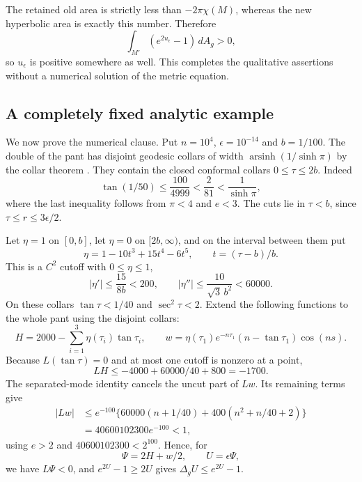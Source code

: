 \documentclass[11pt,a4paper]{article}
\theoremstyle{definition}
\begin{document}
The retained old area is strictly less than $-2\pi\chi(M)$, whereas the new hyperbolic area is exactly this number. Therefore
\[
          \int_{M'}(e^{2u_\epsilon}-1)\,dA_g>0,
\]
so $u_\epsilon$ is positive somewhere as well. This completes the qualitative assertions without a numerical solution of the metric equation.

\subsection{A completely fixed analytic example}
We now prove the numerical clause. Put $n=10^4$, $\epsilon=10^{-14}$ and $b=1/100$. The double of the pant has disjoint geodesic collars of width $\operatorname{arsinh}(1/\sinh\pi)$ by the collar theorem \cite[Theorem~2.18 and proof, pp.~22--24]{McMullen}. They contain the closed conformal collars $0\le\tau\le2b$. Indeed
\[
 \tan(1/50)\le\frac{100}{4999}<\frac2{81}<\frac1{\sinh\pi},
\]
where the last inequality follows from $\pi<4$ and $e<3$. The cuts lie in $\tau<b$, since $\tau\le r\le3\epsilon/2$.

Let $\eta=1$ on $[0,b]$, let $\eta=0$ on $[2b,\infty)$, and on the interval between them put
\[
 \eta=1-10t^3+15t^4-6t^5,\qquad t=(\tau-b)/b.
\]
This is a $C^2$ cutoff with $0\le\eta\le1$,
\[
 |\eta'|\le\frac{15}{8b}<200,\qquad
 |\eta''|\le\frac{10}{\sqrt3\,b^2}<60000.
\]
On these collars $\tan\tau<1/40$ and $\sec^2\tau<2$. Extend the following functions to the whole pant using the disjoint collars:
\[
 H=2000-\sum_{i=1}^3\eta(\tau_i)\tan\tau_i,
 \qquad w=\eta(\tau_1)e^{-n\tau_1}(n-\tan\tau_1)\cos(ns).
\]
Because $L(\tan\tau)=0$ and at most one cutoff is nonzero at a point,
\[
 LH\le-4000+60000/40+800=-1700.
\]
The separated-mode identity cancels the uncut part of $Lw$. Its remaining terms give
\begin{align*}
 |Lw|&\le e^{-100}\{60000(n+1/40)+400(n^2+n/40+2)\}\\
 &=40600102300e^{-100}<1,
\end{align*}
using $e>2$ and $40600102300<2^{100}$. Hence, for
\[
                     \Psi=2H+w/2,\qquad U=\epsilon\Psi,
\]
we have $L\Psi<0$, and $e^{2U}-1\ge2U$ gives $\Delta_gU\le e^{2U}-1$.
\end{document}
